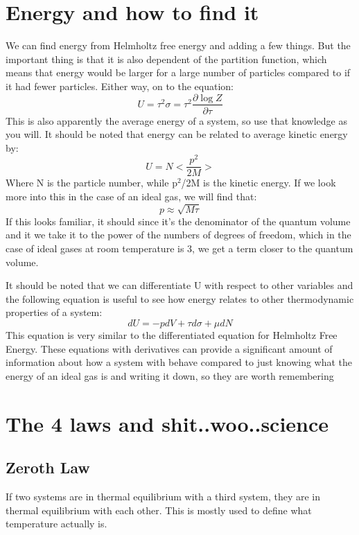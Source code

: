 \documentclass[arial]{article}
\begin{document}
\section*{Energy and how to find it}
We can find energy from Helmholtz free energy and adding a few things. But the important thing is that it is also dependent of the partition function, which means that energy would be larger for a large number of particles compared to if it had fewer particles. Either way, on to the equation:
\begin{equation}
U=\tau^2 \sigma = \tau^2 \frac{\partial \log Z}{\partial \tau}
\end{equation}
This is also apparently the average energy of a system, so use that knowledge as you will. It should be noted that energy can be related to average kinetic energy by:
\begin{equation}
U=N<\frac{p^2}{2M}>
\end{equation}
Where N is the particle number, while p$^2$/2M is the kinetic energy. If we look more into this in the case of an ideal gas, we will find that:
\begin{equation}
p\approx	\sqrt{M\tau}
\end{equation}
If this looks familiar, it should since it's the denominator of the quantum volume and it we take it to the power of the numbers of degrees of freedom, which in the case of ideal gases at room temperature is 3, we get a term closer to the quantum volume.
\vspace{3mm}

It should be noted that we can differentiate U with respect to other variables and the following equation is useful to see how energy relates to other thermodynamic properties of a system:
\begin{equation}
dU=-pdV +\tau d\sigma +\mu dN
\end{equation}
This equation is very similar to the differentiated equation for Helmholtz Free Energy. These equations with derivatives can provide a significant amount of information about how a system with behave compared to just knowing what the energy of an ideal gas is and writing it down, so they are worth remembering
\section*{The 4 laws and shit..woo..science}
\subsection*{Zeroth Law}
If two systems are in thermal equilibrium with a third system, they are in thermal equilibrium with each other. This is mostly used to define what temperature actually is.
\end{document}
